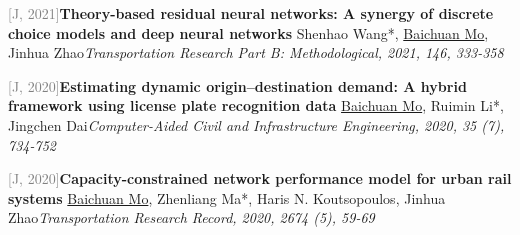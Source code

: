 \par\noindent\begin{minipage}{\linewidth}
{\textcolor{gray}{[J\themyCounter, 2021]\;}}{\textbf{Theory-based residual neural networks: A synergy of discrete choice models and deep neural networks} \href{https://doi.org/10.1016/j.trb.2021.03.002}{\textcolor{cadmiumorange}{\faExternalLink}}}{\newline Shenhao Wang*, \underline{Baichuan Mo}, Jinhua Zhao}{\newline \emph{Transportation Research Part B: Methodological, 2021, 146, 333-358}}{{\;     }}{}
\end{minipage}\par\vspace{5.5pt}


\par\noindent\begin{minipage}{\linewidth}
{\textcolor{gray}{[J\themyCounter, 2020]\;}}{\textbf{Estimating dynamic origin--destination demand: A hybrid framework using license plate recognition data} \href{https://doi.org/10.1111/mice.12526}{\textcolor{cadmiumorange}{\faExternalLink}}}{\newline \underline{Baichuan Mo}, Ruimin Li*, Jingchen Dai}{\newline \emph{Computer-Aided Civil and Infrastructure Engineering, 2020, 35 (7), 734-752}}{{\;     }}{}
\end{minipage}\par\vspace{5.5pt}


\par\noindent\begin{minipage}{\linewidth}
{\textcolor{gray}{[J\themyCounter, 2020]\;}}{\textbf{Capacity-constrained network performance model for urban rail systems} \href{https://doi.org/10.1177/0361198120914309}{\textcolor{cadmiumorange}{\faExternalLink}}}{\newline \underline{Baichuan Mo}, Zhenliang Ma*, Haris N. Koutsopoulos, Jinhua Zhao}{\newline \emph{Transportation Research Record, 2020, 2674 (5), 59-69}}{{\;    }}{}
\end{minipage}\par\vspace{5.5pt}


